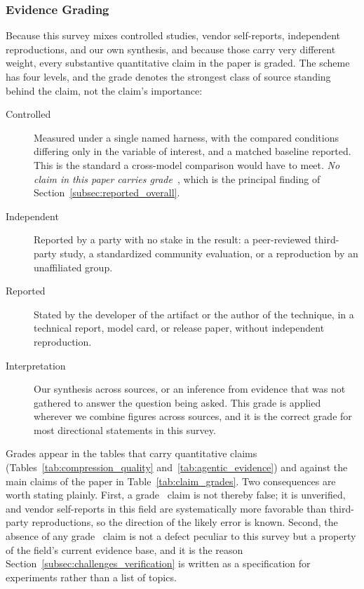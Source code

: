 \subsubsection{Evidence Grading}
\label{subsec:reported_grading}

Because this survey mixes controlled studies, vendor self-reports, independent
reproductions, and our own synthesis, and because those carry very different
weight, every substantive quantitative claim in the paper is graded. The scheme
has four levels, and the grade denotes the strongest class of source standing
behind the claim, not the claim's importance:

\begin{description}
  \item[\evA{} Controlled] Measured under a single named harness, with the
    compared conditions differing only in the variable of interest, and a matched
    baseline reported. This is the standard a cross-model comparison would have
    to meet. \emph{No claim in this paper carries grade~\evA}, which is the
    principal finding of Section~\ref{subsec:reported_overall}.
  \item[\evB{} Independent] Reported by a party with no stake in the result:
    a peer-reviewed third-party study, a standardized community evaluation, or a
    reproduction by an unaffiliated group.
  \item[\evC{} Reported] Stated by the developer of the artifact or the author of
    the technique, in a technical report, model card, or release paper, without
    independent reproduction.
  \item[\evD{} Interpretation] Our synthesis across sources, or an inference from
    evidence that was not gathered to answer the question being asked. This grade
    is applied wherever we combine figures across sources, and it is the correct
    grade for most directional statements in this survey.
\end{description}

Grades appear in the tables that carry quantitative claims
(Tables~\ref{tab:compression_quality} and~\ref{tab:agentic_evidence}) and against
the main claims of the paper in Table~\ref{tab:claim_grades}. Two consequences
are worth stating plainly. First, a grade~\evC{} claim is not thereby false; it
is unverified, and vendor self-reports in this field are systematically more
favorable than third-party reproductions, so the direction of the likely error is
known. Second, the absence of any grade~\evA{} claim is not a defect peculiar to
this survey but a property of the field's current evidence base, and it is the
reason Section~\ref{subsec:challenges_verification} is written as a specification
for experiments rather than a list of topics.

